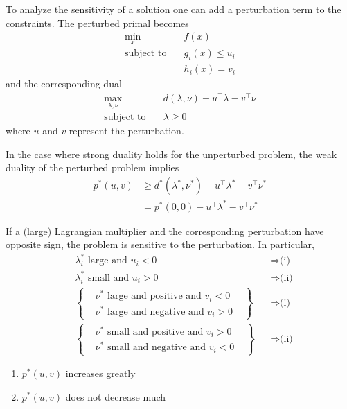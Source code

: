 To analyze the sensitivity of a solution one can add a perturbation term to the constraints. The perturbed primal becomes
\begin{align*}
    \min_{x} \quad         & f(x)            \\
    \text{subject to}\quad & g_i(x) \leq u_i \\
                           & h_i(x) = v_i
\end{align*}
and the corresponding dual
\begin{align*}
    \max_{\lambda,\nu}\quad & d(\lambda,\nu) - u^\top \lambda - v^\top \nu \\
    \text{subject to}\quad  & \lambda \geq 0
\end{align*}
where $u$ and $v$ represent the perturbation.

\newpar{}

In the case where strong duality holds for the unperturbed problem, the weak duality of the perturbed problem implies
\begin{align*}
    p^*(u,v) & \geq d^*(\lambda^*,\nu^*) - u^\top \lambda^* -v^\top\nu^* \\
             & = p^*(0,0) - u^\top \lambda^* -v^\top\nu^*
\end{align*}

\newpar{}

If a (large) Lagrangian multiplier and the corresponding perturbation have opposite sign, the problem is sensitive to the perturbation. In particular,
\begin{align*}
     & \lambda_i^* \text{ large and } u_i < 0              &  & \Rightarrow \text{(i)}  \\
     & \lambda_i^* \text{ small and } u_i > 0              &  & \Rightarrow \text{(ii)} \\
     & \begin{Bmatrix}
            & \nu^* \text{ large and positive and } v_i < 0 \\
            & \nu^* \text{ large and negative and } v_i > 0
            &\end{Bmatrix} &  & \Rightarrow \text{(i)}                                 \\
     & \begin{Bmatrix}
            & \nu^* \text{ small and positive and } v_i > 0 \\
            & \nu^* \text{ small and negative and } v_i < 0
            &\end{Bmatrix} &  & \Rightarrow \text{(ii)}
\end{align*}
\begin{enumerate}[label=(\roman*), wide=0pt]
    \item $p^*(u,v)$ increases greatly
    \item $p^*(u,v)$ does not decrease much
\end{enumerate}

